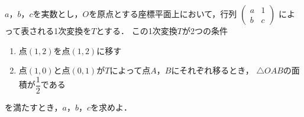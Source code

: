 \documentclass[../../main.tex]{subfiles}
\begin{document}
$a$，$b$，$c$を実数とし，$O$を原点とする座標平面上において，行列
$
\begin{pmatrix} a & 1 \\ b & c
\end{pmatrix}$
によって表される1次変換を$T$とする．
この1次変換$T$が2つの条件
\begin{enumerate}
  \item 点$(1,2)$を点$(1,2)$に移す
  \item 点$(1,0)$と点$(0,1)$が$T$によって点$A$，$B$にそれぞれ移るとき，
    $\triangle OAB$の面積が$\displaystyle\dfrac{1}{2}$である
\end{enumerate}
を満たすとき，$a$，$b$，$c$を求めよ．
\end{document}
